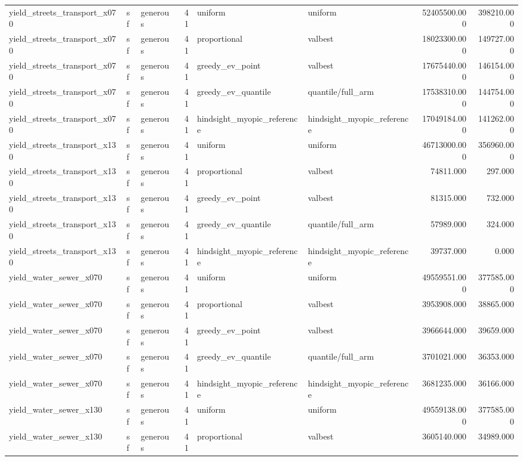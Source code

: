 \begin{tabular}{lllrllrr}
yield\_streets\_transport\_x070 & sf & generous & 41 & uniform & uniform & 52405500.000 & 398210.000 \\
yield\_streets\_transport\_x070 & sf & generous & 41 & proportional & valbest & 18023300.000 & 149727.000 \\
yield\_streets\_transport\_x070 & sf & generous & 41 & greedy\_ev\_point & valbest & 17675440.000 & 146154.000 \\
yield\_streets\_transport\_x070 & sf & generous & 41 & greedy\_ev\_quantile & quantile/full\_arm & 17538310.000 & 144754.000 \\
yield\_streets\_transport\_x070 & sf & generous & 41 & hindsight\_myopic\_reference & hindsight\_myopic\_reference & 17049184.000 & 141262.000 \\
yield\_streets\_transport\_x130 & sf & generous & 41 & uniform & uniform & 46713000.000 & 356960.000 \\
yield\_streets\_transport\_x130 & sf & generous & 41 & proportional & valbest & 74811.000 & 297.000 \\
yield\_streets\_transport\_x130 & sf & generous & 41 & greedy\_ev\_point & valbest & 81315.000 & 732.000 \\
yield\_streets\_transport\_x130 & sf & generous & 41 & greedy\_ev\_quantile & quantile/full\_arm & 57989.000 & 324.000 \\
yield\_streets\_transport\_x130 & sf & generous & 41 & hindsight\_myopic\_reference & hindsight\_myopic\_reference & 39737.000 & 0.000 \\
yield\_water\_sewer\_x070 & sf & generous & 41 & uniform & uniform & 49559551.000 & 377585.000 \\
yield\_water\_sewer\_x070 & sf & generous & 41 & proportional & valbest & 3953908.000 & 38865.000 \\
yield\_water\_sewer\_x070 & sf & generous & 41 & greedy\_ev\_point & valbest & 3966644.000 & 39659.000 \\
yield\_water\_sewer\_x070 & sf & generous & 41 & greedy\_ev\_quantile & quantile/full\_arm & 3701021.000 & 36353.000 \\
yield\_water\_sewer\_x070 & sf & generous & 41 & hindsight\_myopic\_reference & hindsight\_myopic\_reference & 3681235.000 & 36166.000 \\
yield\_water\_sewer\_x130 & sf & generous & 41 & uniform & uniform & 49559138.000 & 377585.000 \\
yield\_water\_sewer\_x130 & sf & generous & 41 & proportional & valbest & 3605140.000 & 34989.000 \\

\end{tabular}
